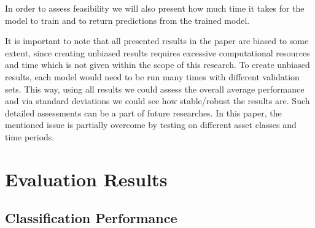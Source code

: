 \documentclass[11pt, a4paper]{article}
\begin{document}
In order to assess feasibility we will also present how much time it takes for the model to train and to return predictions from the trained model.

It is important to note that all presented results in the paper are biased to some extent, since creating unbiased results requires excessive computational resources and time which is not given within the scope of this research. To create unbiased results, each model would need to be run many times with different validation sets. This way, using all results we could assess the overall average performance and via standard deviations we could see how stable/robust the results are. Such detailed assessments can be a part of future researches. In this paper, the mentioned issue is partially overcome by testing on different asset classes and time periods.

\section{Evaluation Results}
\label{sec:ER}

\subsection{Classification Performance}
\label{subsec:ER:ClassPerf}
\end{document}

